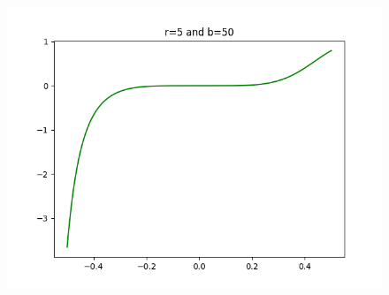 \documentclass[]{scrartcl}
\begin{document}
\begin{figure}[h]
	\centering
	\includegraphics[width=0.5\linewidth]{Exercise4_plots/plot_3}
\end{figure}

%
%
%
%
%
%
%
%
\end{document}
